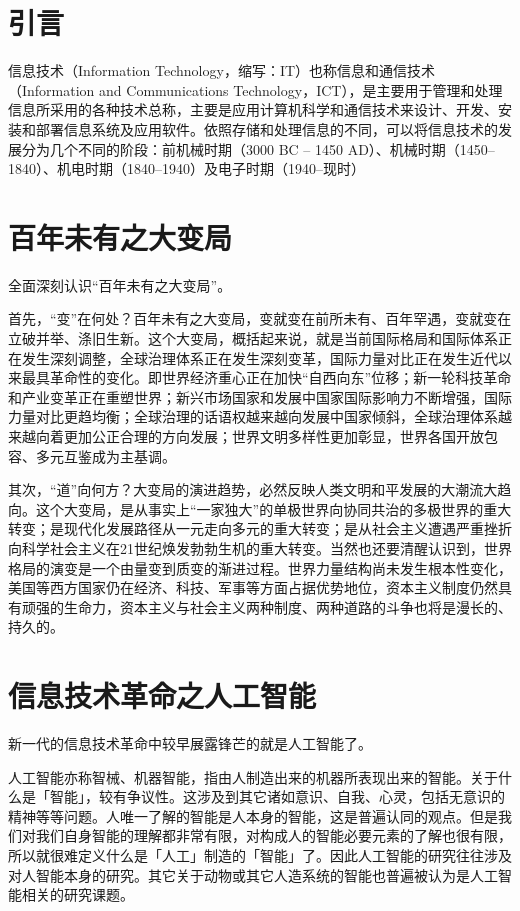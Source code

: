 \documentclass{article}
\begin{document}
\thispagestyle{empty}
\newpage
\setcounter{page}{1}
\section{引言}
信息技术（Information Technology，缩写：IT）也称信息和通信技术（Information and Communications Technology，ICT），是主要用于管理和处理信息所采用的各种技术总称，主要是应用计算机科学和通信技术来设计、开发、安装和部署信息系统及应用软件。依照存储和处理信息的不同，可以将信息技术的发展分为几个不同的阶段：前机械时期（3000 BC – 1450 AD）、机械时期（1450–1840）、机电时期（1840–1940）及电子时期（1940–现时）
\section{百年未有之大变局}
全面深刻认识“百年未有之大变局\citep{libin}”。\par
首先，“变”在何处？百年未有之大变局，变就变在前所未有、百年罕遇，变就变在立破并举、涤旧生新。这个大变局，概括起来说，就是当前国际格局和国际体系正在发生深刻调整，全球治理体系正在发生深刻变革，国际力量对比正在发生近代以来最具革命性的变化。即世界经济重心正在加快“自西向东”位移；新一轮科技革命和产业变革正在重塑世界；新兴市场国家和发展中国家国际影响力不断增强，国际力量对比更趋均衡；全球治理的话语权越来越向发展中国家倾斜，全球治理体系越来越向着更加公正合理的方向发展；世界文明多样性更加彰显，世界各国开放包容、多元互鉴成为主基调。\par
其次，“道”向何方？大变局的演进趋势，必然反映人类文明和平发展的大潮流大趋向。这个大变局，是从事实上“一家独大”的单极世界向协同共治的多极世界的重大转变；是现代化发展路径从一元走向多元的重大转变；是从社会主义遭遇严重挫折向科学社会主义在21世纪焕发勃勃生机的重大转变。当然也还要清醒认识到，世界格局的演变是一个由量变到质变的渐进过程。世界力量结构尚未发生根本性变化，美国等西方国家仍在经济、科技、军事等方面占据优势地位，资本主义制度仍然具有顽强的生命力，资本主义与社会主义两种制度、两种道路的斗争也将是漫长的、持久的。
\section{信息技术革命之人工智能}
新一代的信息技术革命中较早展露锋芒的就是人工智能\citep{poole1998computational}了。\par
人工智能亦称智械、机器智能，指由人制造出来的机器所表现出来的智能。关于什么是「智能」，较有争议性。这涉及到其它诸如意识、自我、心灵，包括无意识的精神等等问题。人唯一了解的智能是人本身的智能，这是普遍认同的观点。但是我们对我们自身智能的理解都非常有限，对构成人的智能必要元素的了解也很有限，所以就很难定义什么是「人工」制造的「智能」了。因此人工智能的研究往往涉及对人智能本身的研究。其它关于动物或其它人造系统的智能也普遍被认为是人工智能相关的研究课题。
\end{document}
